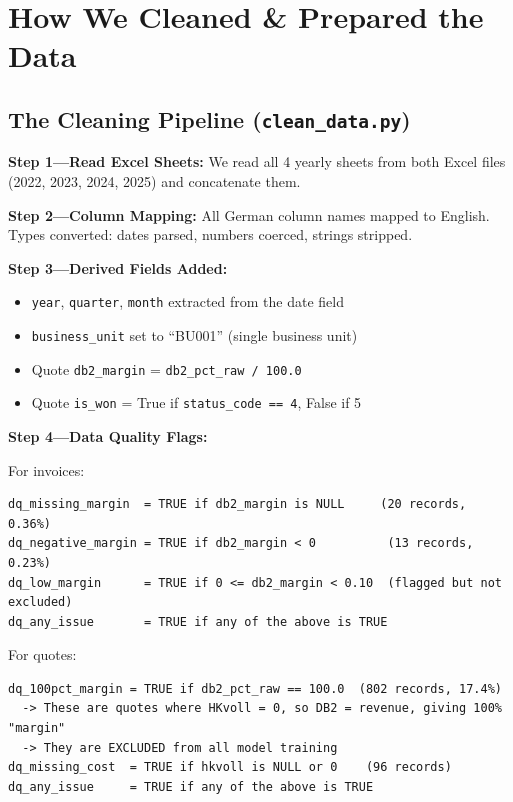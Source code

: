 \documentclass[11pt,a4paper]{article}
\newcommand{\code}[1]{\texttt{#1}}
\begin{document}
\section{How We Cleaned \& Prepared the Data}

\subsection{The Cleaning Pipeline (\code{clean\_data.py})}

\textbf{Step 1---Read Excel Sheets:} We read all 4 yearly sheets from both Excel files (2022, 2023, 2024, 2025) and concatenate them.

\textbf{Step 2---Column Mapping:} All German column names mapped to English. Types converted: dates parsed, numbers coerced, strings stripped.

\textbf{Step 3---Derived Fields Added:}
\begin{itemize}[nosep]
  \item \code{year}, \code{quarter}, \code{month} extracted from the date field
  \item \code{business\_unit} set to ``BU001'' (single business unit)
  \item Quote \code{db2\_margin} = \code{db2\_pct\_raw / 100.0}
  \item Quote \code{is\_won} = True if \code{status\_code == 4}, False if 5
\end{itemize}

\textbf{Step 4---Data Quality Flags:}

For invoices:
\begin{lstlisting}
dq_missing_margin  = TRUE if db2_margin is NULL     (20 records, 0.36%)
dq_negative_margin = TRUE if db2_margin < 0          (13 records, 0.23%)
dq_low_margin      = TRUE if 0 <= db2_margin < 0.10  (flagged but not excluded)
dq_any_issue       = TRUE if any of the above is TRUE
\end{lstlisting}

For quotes:
\begin{lstlisting}
dq_100pct_margin = TRUE if db2_pct_raw == 100.0  (802 records, 17.4%)
  -> These are quotes where HKvoll = 0, so DB2 = revenue, giving 100% "margin"
  -> They are EXCLUDED from all model training
dq_missing_cost  = TRUE if hkvoll is NULL or 0    (96 records)
dq_any_issue     = TRUE if any of the above is TRUE
\end{lstlisting}
\end{document}
